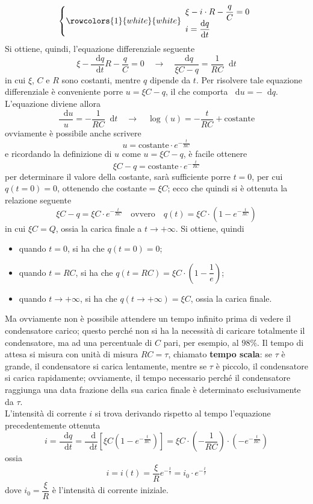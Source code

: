 \documentclass[a4paper]{extarticle}
\newcommand\dif{\mathop{}\!\mathrm{d}}
\begin{document}
\[\left\{
  \rowcolors{1}{white}{white}
  \begin{array}{l}
    \xi - i \cdot R - \dfrac{q}{C}=0\\
    i=\dfrac{\dif q}{\dif t}\\
\end{array}\right.\]
Si ottiene, quindi, l'equazione differenziale seguente
\[\xi - \dfrac{\dif q}{\dif t} R - \dfrac{q}{C} = 0 \hspace{1em} \rightarrow \hspace{1em} \dfrac{\dif q}{\xi C - q} = \dfrac{1}{RC} \dif t\]
in cui $\xi$, $C$ e $R$ sono costanti, mentre $q$ dipende da $t$. Per risolvere tale equazione differenziale è conveniente porre $u=\xi C - q$, il che comporta $\dif u = - \dif q$. L'equazione diviene allora
\[\dfrac{\dif u}{u} = - \dfrac{1}{RC} \dif t \hspace{1em} \rightarrow \hspace{1em} \log(u) = - \dfrac{t}{RC} + \text{costante}\]
ovviamente è possibile anche scrivere
\[u = \text{costante} \cdot e^{-\frac{t}{RC}}\]
e ricordando la definizione di $u$ come $u=\xi C - q$, è facile ottenere
\[\xi C - q = \text{costante} \cdot e^{-\frac{t}{RC}}\]
per determinare il valore della costante, sarà sufficiente porre $t=0$, per cui $q(t=0)=0$, ottenendo che costante$=\xi C$; ecco che quindi si è ottenuta la relazione seguente
\[\xi C - q = \xi C \cdot e^{-\frac{t}{RC}} \hspace{1em} \text{ovvero} \hspace{1em} \boxed{q(t) = \xi C \cdot \left(1-e^{-\frac{t}{RC}}\right)}\]
in cui $\xi C = Q$, ossia la carica finale a $t\to+\infty$. Si ottiene, quindi
\begin{itemize}
  \item quando $t=0$, si ha che $q(t=0)=0$;
  \item quando $t=RC$, si ha che $q(t=RC)=\xi C \cdot \left(1-\dfrac{1}{e}\right)$;
  \item quando $t\to+\infty$, si ha che $q(t\to+\infty)=\xi C$, ossia la carica finale.
\end{itemize}
Ma ovviamente non è possibile attendere un tempo infinito prima di vedere il condensatore carico; questo perché non si ha la necessità di caricare totalmente il condensatore, ma ad una percentuale di $C$ pari, per esempio, al $98\%$. Il tempo di attesa si misura con unità di misura $RC=\tau$, chiamato \textbf{tempo scala}: se $\tau$ è grande, il condensatore si carica lentamente, mentre se $\tau$ è piccolo, il condensatore si carica rapidamente; ovviamente, il tempo necessario perché il condensatore raggiunga una data frazione della sua carica finale è determinato esclusivamente da $\tau$.\\
L'intensità di corrente $i$ si trova derivando rispetto al tempo l'equazione precedentemente ottenuta
\[i=\dfrac{\dif q}{\dif t} = \dfrac{\dif }{\dif t} \left[\xi C (1-e^{-\frac{t}{RC}})\right] = \xi C \cdot \left(-\dfrac{1}{RC}\right) \cdot (-e^{-\frac{t}{RC}})\]
ossia
\[\boxed{i=i(t) = \frac{\xi}{R} e^{-\frac{t}{\tau}} = i_0 \cdot e^{-\frac{t}{\tau}}}\]
dove $i_0=\dfrac{\xi}{R}$ è l'intensità di corrente iniziale.
\end{document}
